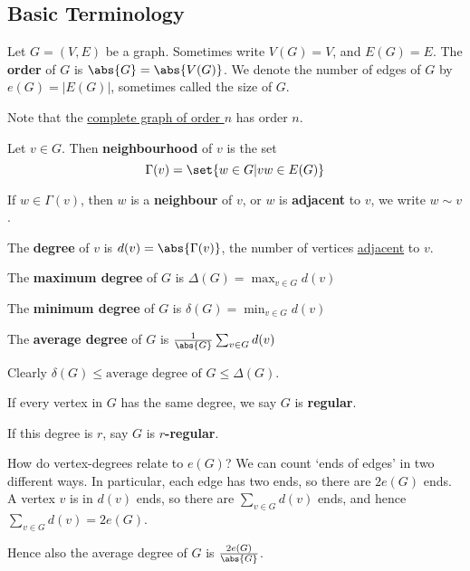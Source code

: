 \documentclass{article}
\begin{document}
\subsection{Basic Terminology}

Let $G = (V, E)$ be a graph. Sometimes write $V(G) = V$, and $E(G) = E$.
The \textbf{order} of $G$ is $\abs{G} = \abs{V(G)}$. We denote the number of edges of $G$ by $e(G) = |E(G)|$, sometimes called the size of $G$.

Note that the \hyperlink{def:Kn}{complete graph of order $n$} has order $n$.

\begin{defi}
    Let $v \in G$. Then \textbf{neighbourhood} of $v$ is the set
    \begin{equation*}
        \Gamma(v) = \set{w \in G | vw \in E(G)}
    \end{equation*}

    If $w \in \Gamma(v)$, then $w$ is a \textbf{neighbour} of $v$, or $w$ is \textbf{adjacent} to $v$, we write $w \sim v$.
\end{defi}

\begin{defi}
    The \textbf{degree} of $v$ is $d(v) = \abs{\Gamma(v)}$, the number of vertices \hyperlink{def:neighbour}{adjacent} to $v$.

    The \textbf{maximum degree} of $G$ is $\Delta(G) = \max_{v \in G} d(v)$

    The \textbf{minimum degree} of $G$ is $\delta(G) = \min_{v \in G} d(v)$

    The \textbf{average degree} of $G$ is $\frac{1}{\abs{G}} \sum_{v \in G} d(v)$
\end{defi}

Clearly $\delta(G) \leq \text{average degree of } G \leq \Delta(G)$.

\begin{defi}
    If every vertex in $G$ has the same degree, we say $G$ is \textbf{regular}.

    If this degree is $r$, say $G$ is \textbf{$r$-regular}.
\end{defi}

\begin{eg}
    How do vertex-degrees relate to $e(G)$?  We can count `ends of edges' in two different ways. In particular, each edge has two ends, so there are $2 e(G)$ ends. A vertex $v$ is in $d(v)$ ends, so there are $\sum_{v \in G} d(v)$ ends, and hence  $\sum_{v \in G} d(v)= 2 e(G)$.

    Hence also the average degree of $G$ is $\frac{2e(G)}{\abs{G}}$.
\end{eg}
\end{document}
